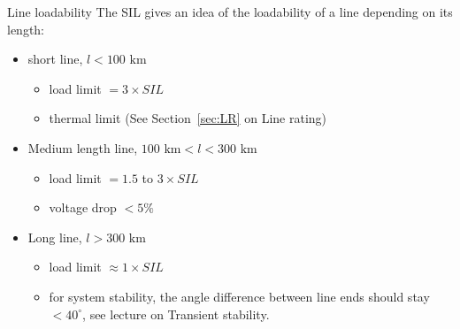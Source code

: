 \begin{frame}{Line loadability}
    The SIL gives an idea of the loadability of a line depending on its length:
    \begin{itemize}
        \item short line, $ l < 100 \text{ km}$
        \begin{itemize}
            \item load limit $= 3 \times SIL$
            \item thermal limit (See Section~\ref{sec:LR} on Line rating)
        \end{itemize}
        \item Medium length line, $ 100 \text{ km} < l < 300 \text{ km}$
        \begin{itemize}
            \item load limit $= 1.5$ to $3 \times SIL$
            \item voltage drop $< 5\%$
        \end{itemize}
        \item Long line, $ l > 300 \text{ km}$
        \begin{itemize}
            \item load limit $\approx 1 \times SIL$
            \item for system stability, the angle difference between line ends should stay $< 40^\circ$, see lecture on Transient stability.
        \end{itemize}
    \end{itemize}
\end{frame}


